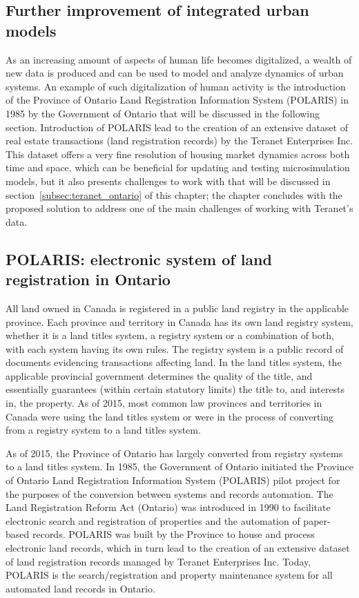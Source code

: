 \subsection{Further improvement of integrated urban models} \label{subsec:further_improvement_of_iums}


As an increasing amount of aspects of human life becomes digitalized, a wealth of new data is produced and can be used to model and analyze dynamics of urban systems\cite{Arribas-Bel2014, Chen2016}.
An example of such digitalization of human activity is the introduction of the Province of Ontario Land Registration Information System (POLARIS) in 1985 by the Government of Ontario\cite{TeranetEnterprisesInc.} that will be discussed in the following section.
Introduction of POLARIS lead to the creation of an extensive dataset of real estate transactions (land registration records) by the Teranet Enterprises Inc.
This dataset offers a very fine resolution of housing market dynamics across both time and space, which can be beneficial for updating and testing microsimulation models, but it also presents challenges to work with that will be discussed in section~\ref{subsec:teranet_ontario} of this chapter;
the chapter concludes with the proposed solution to address one of the main challenges of working with Teranet's data.

\subsection{POLARIS: electronic system of land registration in Ontario} \label{subsec:land_reg_system_canada}

All land owned in Canada is registered in a public land registry in the applicable province.
Each province and territory in Canada has its own land registry system, whether it is a land titles system, a registry system or a combination of both, with each system having its own rules.
The registry system is a public record of documents evidencing transactions affecting land.
In the land titles system, the applicable provincial government determines the quality of the title, and essentially guarantees (within certain statutory limits) the title to, and interests in, the property.
As of 2015, most common law provinces and territories in Canada were using the land titles system or were in the process of converting from a registry system to a land titles system\cite{McKean2015}.

As of 2015, the Province of Ontario has largely converted from registry systems to a land titles system.
In 1985, the Government of Ontario initiated the Province of Ontario Land Registration Information System (POLARIS) pilot project for the purposes of the conversion between systems and records automation.
The Land Registration Reform Act (Ontario)\cite{TheGovernmentofOntario1990} was introduced in 1990 to facilitate electronic search and registration of properties and the automation of paper-based records.
POLARIS was built by the Province to house and process electronic land records, which in turn lead to the creation of an extensive dataset of land registration records managed by Teranet Enterprises Inc.
Today, POLARIS is the search/registration and property maintenance system for all automated land records in Ontario.

